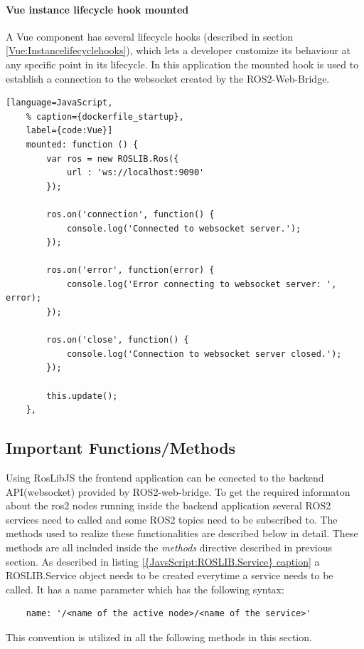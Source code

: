 \paragraph{Vue instance lifecycle hook mounted} A Vue component has several lifecycle hooks (described in section \ref{Vue:Instancelifecyclehooks}), which lets a developer customize its behaviour at any specific point in its lifecycle. In this application the mounted hook is used to establish a connection to the websocket created by the ROS2-Web-Bridge.
\begin{lstlisting}[language=JavaScript,
	% caption={dockerfile_startup}, 
	label={code:Vue}]
	mounted: function () {
		var ros = new ROSLIB.Ros({
			url : 'ws://localhost:9090'
		});

		ros.on('connection', function() {
			console.log('Connected to websocket server.');
		});

		ros.on('error', function(error) {
			console.log('Error connecting to websocket server: ', error);
		});

		ros.on('close', function() {
			console.log('Connection to websocket server closed.');
		});

		this.update();
	},
\end{lstlisting}

\subsection{Important Functions/Methods}
\label{Implementation:ImportantFunctions}
Using RosLibJS the frontend application can be conected to the backend API(websocket) provided by ROS2-web-bridge. To get the required informaton about the ros2 nodes running inside the backend application several ROS2 services need to called and some ROS2 topics need to be subscribed to. The methods used to realize these functionalities are described below in detail. These methods are all included inside the \textit{methods} directive described in previous section. As described in listing \ref{{JavsScript:ROSLIB.Service} caption} a ROSLIB.Service object needs to be created everytime a service needs to be called. It has a name parameter which has the 
following syntax: 
\begin{lstlisting}
	name: '/<name of the active node>/<name of the service>'
\end{lstlisting}
This convention is utilized in all the following methods in this section.

